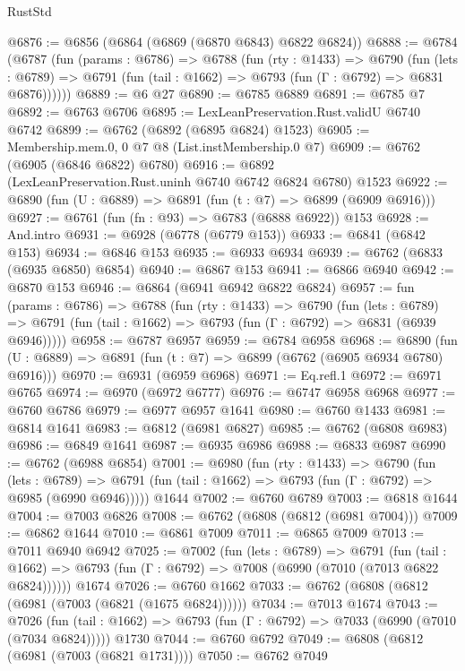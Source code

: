 \begin{lexlean}{RustStd}
\begin{coremodule}
@6876 := @6856 (@6864 (@6869 (@6870 @6843) @6822 @6824))
@6888 := @6784
    (@6787
      (fun (params : @6786) =>
      @6788
        (fun (rty : @1433) =>
        @6790
          (fun (lets : @6789) =>
          @6791 (fun (tail : @1662) => @6793 (fun (Γ : @6792) => @6831 @6876))))))
@6889 := @6 @27
@6890 := @6785 @6889
@6891 := @6785 @7
@6892 := @6763 @6706
@6895 := LexLeanPreservation.Rust.validU @6740 @6742
@6899 := @6762 (@6892 (@6895 @6824) @1523)
@6905 := Membership.mem.{0, 0} @7 @8 (List.instMembership.{0} @7)
@6909 := @6762 (@6905 (@6846 @6822) @6780)
@6916 := @6892 (LexLeanPreservation.Rust.uninh @6740 @6742 @6824 @6780) @1523
@6922 := @6890 (fun (U : @6889) => @6891 (fun (t : @7) => @6899 (@6909 @6916)))
@6927 := @6761 (fun (fn : @93) => @6783 (@6888 @6922)) @153
@6928 := And.intro
@6931 := @6928 (@6778 (@6779 @153))
@6933 := @6841 (@6842 @153)
@6934 := @6846 @153
@6935 := @6933 @6934
@6939 := @6762 (@6833 (@6935 @6850) @6854)
@6940 := @6867 @153
@6941 := @6866 @6940
@6942 := @6870 @153
@6946 := @6864 (@6941 @6942 @6822 @6824)
@6957 := fun (params : @6786) =>
  @6788
    (fun (rty : @1433) =>
    @6790
      (fun (lets : @6789) =>
      @6791 (fun (tail : @1662) => @6793 (fun (Γ : @6792) => @6831 (@6939 @6946)))))
@6958 := @6787 @6957
@6959 := @6784 @6958
@6968 := @6890 (fun (U : @6889) => @6891 (fun (t : @7) => @6899 (@6762 (@6905 @6934 @6780) @6916)))
@6970 := @6931 (@6959 @6968)
@6971 := Eq.refl.{1}
@6972 := @6971 @6765
@6974 := @6970 (@6972 @6777)
@6976 := @6747 @6958 @6968
@6977 := @6760 @6786
@6979 := @6977 @6957 @1641
@6980 := @6760 @1433
@6981 := @6814 @1641
@6983 := @6812 (@6981 @6827)
@6985 := @6762 (@6808 @6983)
@6986 := @6849 @1641
@6987 := @6935 @6986
@6988 := @6833 @6987
@6990 := @6762 (@6988 @6854)
@7001 := @6980
    (fun (rty : @1433) =>
    @6790
      (fun (lets : @6789) =>
      @6791 (fun (tail : @1662) => @6793 (fun (Γ : @6792) => @6985 (@6990 @6946)))))
    @1644
@7002 := @6760 @6789
@7003 := @6818 @1644
@7004 := @7003 @6826
@7008 := @6762 (@6808 (@6812 (@6981 @7004)))
@7009 := @6862 @1644
@7010 := @6861 @7009
@7011 := @6865 @7009
@7013 := @7011 @6940 @6942
@7025 := @7002
    (fun (lets : @6789) =>
    @6791
      (fun (tail : @1662) => @6793 (fun (Γ : @6792) => @7008 (@6990 (@7010 (@7013 @6822 @6824))))))
    @1674
@7026 := @6760 @1662
@7033 := @6762 (@6808 (@6812 (@6981 (@7003 (@6821 (@1675 @6824))))))
@7034 := @7013 @1674
@7043 := @7026
    (fun (tail : @1662) => @6793 (fun (Γ : @6792) => @7033 (@6990 (@7010 (@7034 @6824)))))
    @1730
@7044 := @6760 @6792
@7049 := @6808 (@6812 (@6981 (@7003 (@6821 @1731))))
@7050 := @6762 @7049

\end{coremodule}
\end{lexlean}
